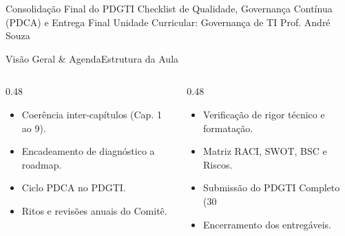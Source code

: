 
\senaicover
  {Consolidação Final do PDGTI}
  {Checklist de Qualidade, Governança Contínua (PDCA) e Entrega Final}
  {Unidade Curricular: Governança de TI}
  {Prof. André Souza}

\begin{senaiframe}{Visão Geral \& Agenda}{Estrutura da Aula}
  \begin{columns}[t]
    \begin{column}{0.48\textwidth}
      \begin{tcolorbox}[senaibluecard, title={1. Visão Sistêmica}]
        \begin{itemize}
          \item Coerência inter-capítulos (Cap. 1 ao 9).
          \item Encadeamento de diagnóstico a roadmap.
        \end{itemize}
      \end{tcolorbox}
      \vspace{4pt}
      \begin{tcolorbox}[senaiambercard, title={3. Governança Contínua}]
        \begin{itemize}
          \item Ciclo PDCA no PDGTI.
          \item Ritos e revisões anuais do Comitê.
        \end{itemize}
      \end{tcolorbox}
    \end{column}
    \begin{column}{0.48\textwidth}
      \begin{tcolorbox}[senairedcard, title={2. Checklist de Qualidade}]
        \begin{itemize}
          \item Verificação de rigor técnico e formatação.
          \item Matriz RACI, SWOT, BSC e Riscos.
        \end{itemize}
      \end{tcolorbox}
      \vspace{4pt}
      \begin{tcolorbox}[senaigreencard, title={4. Entrega Final}]
        \begin{itemize}
          \item Submissão do PDGTI Completo (30%
          \item Encerramento dos entregáveis.
        \end{itemize}
      \end{tcolorbox}
    \end{column}
  \end{columns}
\end{senaiframe}

